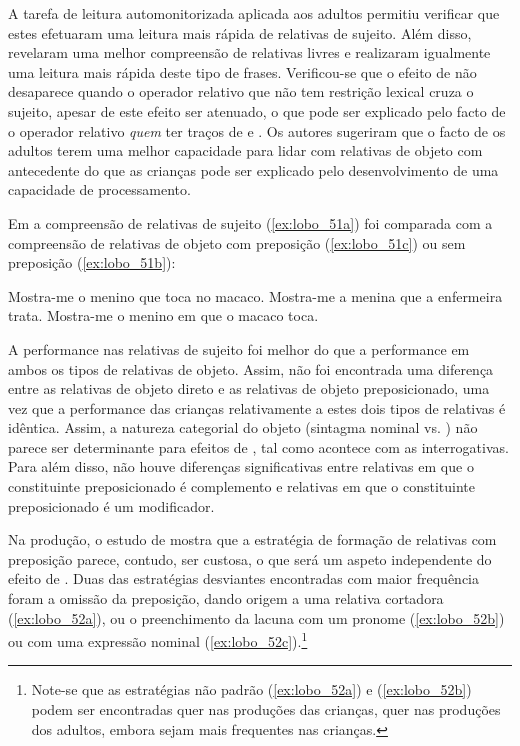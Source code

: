 \documentclass[output=paper]{LSP/langsci}
\begin{document}
A tarefa de leitura automonitorizada aplicada aos adultos permitiu verificar que estes efetuaram uma leitura mais rápida de relativas de sujeito. Além disso, revelaram uma melhor compreensão de relativas livres e realizaram igualmente uma leitura mais rápida deste tipo de frases. Verificou-se que o efeito de  não desaparece quando o operador relativo que não tem restrição lexical cruza o sujeito, apesar de este efeito ser atenuado, o que pode ser explicado pelo facto de o operador relativo \textit{quem} ter traços de  e . Os autores sugeriram que o facto de os adultos terem uma melhor capacidade para lidar com relativas de objeto com antecedente do que as crianças pode ser explicado pelo desenvolvimento de uma capacidade de processamento.

Em \citet{costa_etal2014,costa_etal2013} a compreensão de relativas de sujeito (\ref{ex:lobo_51a}) foi comparada com a compreensão de relativas de objeto com preposição (\ref{ex:lobo_51c}) ou sem preposição (\ref{ex:lobo_51b}):

\ea\label{ex:lobo_51}
\ea\label{ex:lobo_51a} Mostra-me o menino que toca no macaco.
\ex\label{ex:lobo_51b} Mostra-me a menina que a enfermeira trata.
\ex\label{ex:lobo_51c} Mostra-me o menino em que o macaco toca.
\zl

A performance nas relativas de sujeito foi melhor do que a performance em ambos os tipos de relativas de objeto. Assim, não foi encontrada uma diferença entre as relativas de objeto direto e as relativas de objeto preposicionado, uma vez que a performance das crianças relativamente a estes dois tipos de relativas é idêntica. Assim, a natureza categorial do objeto (sintagma nominal vs. ) não parece ser determinante para efeitos de , tal como acontece com as interrogativas. Para além disso, não houve diferenças significativas entre relativas em que o constituinte preposicionado é complemento e relativas em que o constituinte preposicionado é um modificador.


Na produção, o estudo de \citet{costasilva2014} mostra que a estratégia de formação de relativas com preposição parece, contudo, ser custosa, o que será um aspeto independente do efeito de . Duas das estratégias desviantes encontradas com maior frequência foram a omissão da preposição, dando origem a uma relativa cortadora (\ref{ex:lobo_52a}), ou o preenchimento da lacuna com um pronome (\ref{ex:lobo_52b}) ou com uma expressão nominal (\ref{ex:lobo_52c}).\footnote{Note-se que as estratégias não padrão (\ref{ex:lobo_52a}) e (\ref{ex:lobo_52b}) podem ser encontradas quer nas produções das crianças, quer nas produções dos adultos, embora sejam mais frequentes nas crianças.}
\end{document}
